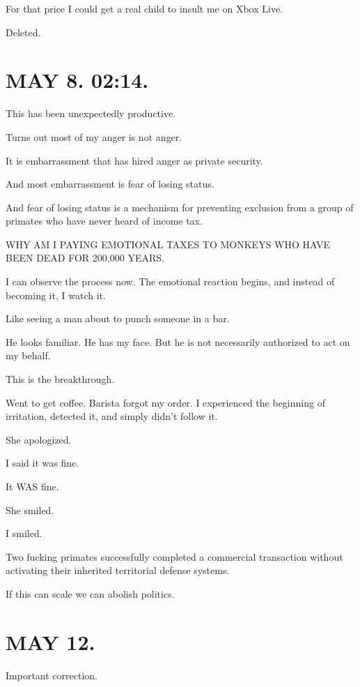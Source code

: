 \documentclass[11pt,oneside]{book}
\begin{document}
For that price I could get a real child to insult me on Xbox Live.

Deleted.

\section*{MAY 8. 02:14.}

This has been unexpectedly productive.

Turns out most of my anger is not anger.

It is embarrassment that has hired anger as private security.

And most embarrassment is fear of losing status.

And fear of losing status is a mechanism for preventing exclusion from a group of primates who have never heard of income tax.

WHY AM I PAYING EMOTIONAL TAXES TO MONKEYS WHO HAVE BEEN DEAD FOR 200,000 YEARS.

I can observe the process now. The emotional reaction begins, and instead of becoming it, I watch it.

Like seeing a man about to punch someone in a bar.

He looks familiar. He has my face. But he is not necessarily authorized to act on my behalf.

This is the breakthrough.

Went to get coffee. Barista forgot my order. I experienced the beginning of irritation, detected it, and simply didn't follow it.

She apologized.

I said it was fine.

It WAS fine.

She smiled.

I smiled.

Two fucking primates successfully completed a commercial transaction without activating their inherited territorial defense systems.

If this can scale we can abolish politics.

\section*{MAY 12.}

Important correction.
\end{document}
